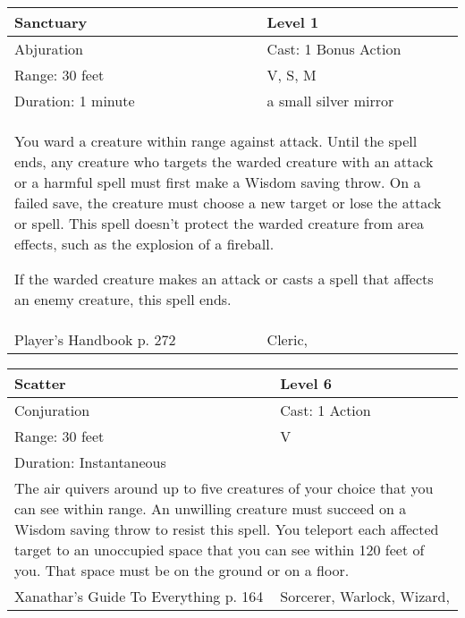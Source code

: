 \documentclass[11pt]{report}
\begin{document}
\begin{table}[H]
	\begin{tabular}{||p{6cm}|p{6cm}||}
		\hline\hline
		\bf{Sanctuary} & Level 1\\ \hline
		Abjuration & Cast: 1 Bonus Action\\ \hline
		Range: 30 feet & V, S, M\\ \hline
		Duration: 1 minute & a small silver mirror\\ \hline
		\multicolumn{2}{||p{12cm}||}{You ward a creature within range against attack.
Until the spell ends, any creature who targets the warded creature with an attack or a harmful spell must first make a Wisdom saving throw. On a failed save, the creature must choose a new target or lose the attack or spell. This spell doesn’t protect the warded creature from area effects, such as the explosion of a fireball.

If the warded creature makes an attack or casts a spell that affects an enemy creature, this spell ends.}\\ \hline
Player's Handbook p. 272 & Cleric, \\ \hline\hline
	\end{tabular}
\end{table}

\begin{table}[H]
	\begin{tabular}{||p{6cm}|p{6cm}||}
		\hline\hline
		\bf{Scatter} & Level 6\\ \hline
		Conjuration & Cast: 1 Action\\ \hline
		Range: 30 feet & V\\ \hline
		Duration: Instantaneous & \\ \hline
		\multicolumn{2}{||p{12cm}||}{The air quivers around up to five creatures of your choice that you can see within range. An unwilling creature must succeed on a Wisdom saving throw to resist this spell. You teleport each affected target to an unoccupied space that you can see within 120 feet of you. That space must be on the ground or on a floor.}\\ \hline
Xanathar's Guide To Everything p. 164 & Sorcerer, Warlock, Wizard, \\ \hline\hline
	\end{tabular}
\end{table}
\end{document}
